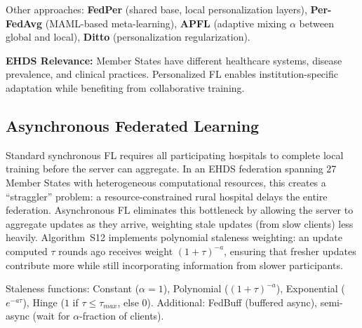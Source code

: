 \documentclass[conference,a4paper]{IEEEtran}
\begin{document}
Other approaches: \textbf{FedPer} (shared base, local personalization layers), \textbf{Per-FedAvg} (MAML-based meta-learning), \textbf{APFL} (adaptive mixing $\alpha$ between global and local), \textbf{Ditto} (personalization regularization).

\textbf{EHDS Relevance:} Member States have different healthcare systems, disease prevalence, and clinical practices. Personalized FL enables institution-specific adaptation while benefiting from collaborative training.

\subsection{Asynchronous Federated Learning}

Standard synchronous FL requires all participating hospitals to complete local training before the server can aggregate. In an EHDS federation spanning 27 Member States with heterogeneous computational resources, this creates a ``straggler'' problem: a resource-constrained rural hospital delays the entire federation. Asynchronous FL eliminates this bottleneck by allowing the server to aggregate updates as they arrive, weighting stale updates (from slow clients) less heavily. Algorithm~S12 implements polynomial staleness weighting: an update computed $\tau$ rounds ago receives weight $(1+\tau)^{-a}$, ensuring that fresher updates contribute more while still incorporating information from slower participants.

\begin{figure}[htbp]
\centering
{}
\end{figure}

Staleness functions: Constant ($\alpha{=}1$), Polynomial ($(1{+}\tau)^{-a}$), Exponential ($e^{-a\tau}$), Hinge ($1$ if $\tau \leq \tau_{max}$, else $0$). Additional: FedBuff (buffered async), semi-async (wait for $\alpha$-fraction of clients).
\end{document}
